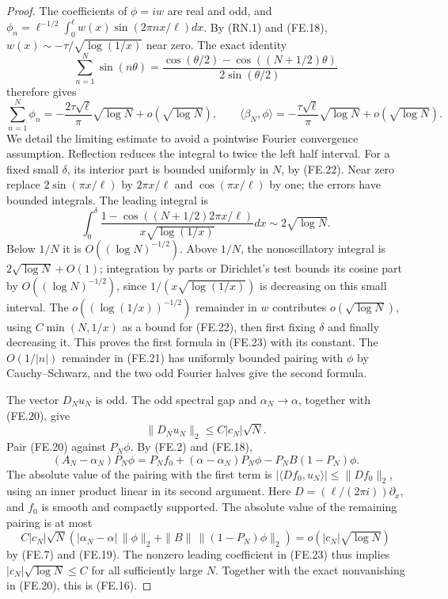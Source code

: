 \begin{proof}
The coefficients of \(\phi=iw\) are real and odd, and
\(\phi_n=\ell^{-1/2}\int_0^\ell w(x)\sin(2\pi nx/\ell)dx\).
By (RN.1) and (FE.18),
\(w(x)\sim-\tau/\sqrt{\log(1/x)}\) near zero.
The exact identity
\[
 \sum_{n=1}^N\sin(n\theta)
       =\frac{\cos(\theta/2)-\cos((N+1/2)\theta)}
                    {2\sin(\theta/2)}                  \tag{FE.22}
\]
therefore gives
\[
 \sum_{n=1}^N\phi_n
       =-\frac{2\tau\sqrt\ell}{\pi}\sqrt{\log N}
                               +o(\sqrt{\log N}),
 \qquad
 \langle\beta_N,\phi\rangle
       =-\frac{\tau\sqrt\ell}{\pi}\sqrt{\log N}
                               +o(\sqrt{\log N}).        \tag{FE.23}
\]
We detail the limiting estimate to avoid a pointwise Fourier
convergence assumption.  Reflection reduces the integral to twice
the left half interval.  For a fixed small \(\delta\), its interior
part is bounded uniformly in \(N\), by (FE.22).
Near zero replace \(2\sin(\pi x/\ell)\) by \(2\pi x/\ell\)
and \(\cos(\pi x/\ell)\) by one; the errors have bounded integrals.
The leading integral is
\[
 \int_0^\delta\frac{1-\cos((N+1/2)2\pi x/\ell)}
                         {x\sqrt{\log(1/x)}}dx
                         \sim2\sqrt{\log N}.             \tag{FE.24}
\]
Below \(1/N\) it is \(O((\log N)^{-1/2})\).
Above \(1/N\), the nonoscillatory integral is
\(2\sqrt{\log N}+O(1)\); integration by parts or Dirichlet's
test bounds its cosine part by \(O((\log N)^{-1/2})\), since
\(1/(x\sqrt{\log(1/x)})\) is decreasing on this small interval.
The \(o((\log(1/x))^{-1/2})\) remainder in \(w\) contributes
\(o(\sqrt{\log N})\), using
\(C\min(N,1/x)\) as a bound for (FE.22), then first fixing
\(\delta\) and finally decreasing it.
This proves the first formula in (FE.23) with its constant.
The \(O(1/|n|)\) remainder in (FE.21) has uniformly bounded
pairing with \(\phi\) by Cauchy--Schwarz, and the two odd
Fourier halves give the second formula.

The vector \(D_Nu_N\) is odd.  The odd spectral gap and
\(\alpha_N\to\alpha\), together with (FE.20), give
\[
                         \|D_Nu_N\|_2\leq C|c_N|\sqrt N.
                                                        \tag{FE.25}
\]
Pair (FE.20) against \(P_N\phi\).  By (FE.2) and (FE.18),
\[
 (A_N-\alpha_N)P_N\phi
       =P_Nf_0+(\alpha-\alpha_N)P_N\phi
                                  -P_NB(1-P_N)\phi.     \tag{FE.26}
\]
The absolute value of the pairing with the first term is
\(|\langle D f_0,u_N\rangle|\leq\|D f_0\|_2\), using an inner
product linear in its second argument.
Here \(D=(\ell/(2\pi i))\partial_x\), and \(f_0\) is smooth
and compactly supported.  The absolute value of the remaining
pairing is at most
\[
 C|c_N|\sqrt N
   \left(|\alpha_N-\alpha|\,\|\phi\|_2
                     +\|B\|\,\|(1-P_N)\phi\|_2\right)
                         =o(|c_N|\sqrt{\log N})           \tag{FE.27}
\]
by (FE.7) and (FE.19).
The nonzero leading coefficient in (FE.23) thus implies
\(|c_N|\sqrt{\log N}\leq C\) for all sufficiently large \(N\).
Together with the exact nonvanishing in (FE.20), this is (FE.16).


\end{proof}
